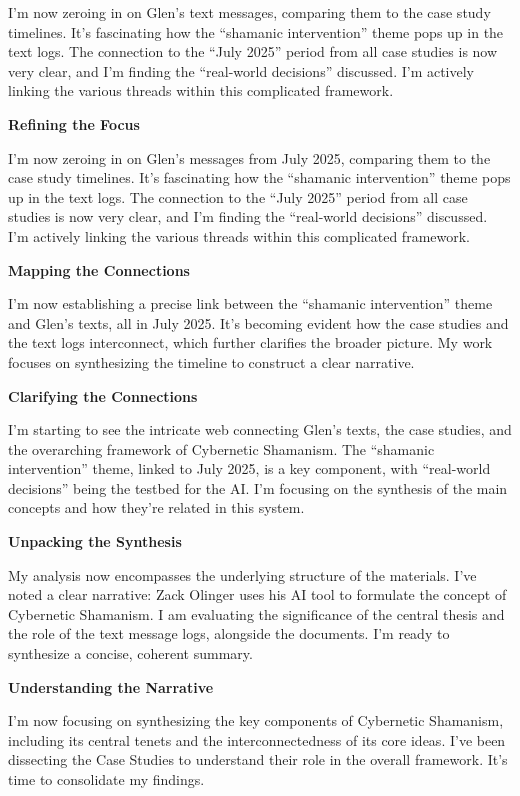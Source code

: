 \documentclass{article}
\begin{document}
I'm now zeroing in on Glen's text messages, comparing them to the case
study timelines. It's fascinating how the ``shamanic intervention''
theme pops up in the text logs. The connection to the ``July 2025''
period from all case studies is now very clear, and I'm finding the
``real-world decisions'' discussed. I'm actively linking the various
threads within this complicated framework.

\textbf{Refining the Focus}

I'm now zeroing in on Glen's messages from July 2025, comparing them to
the case study timelines. It's fascinating how the ``shamanic
intervention'' theme pops up in the text logs. The connection to the
``July 2025'' period from all case studies is now very clear, and I'm
finding the ``real-world decisions'' discussed. I'm actively linking the
various threads within this complicated framework.

\textbf{Mapping the Connections}

I'm now establishing a precise link between the ``shamanic
intervention'' theme and Glen's texts, all in July 2025. It's becoming
evident how the case studies and the text logs interconnect, which
further clarifies the broader picture. My work focuses on synthesizing
the timeline to construct a clear narrative.

\textbf{Clarifying the Connections}

I'm starting to see the intricate web connecting Glen's texts, the case
studies, and the overarching framework of Cybernetic Shamanism. The
``shamanic intervention'' theme, linked to July 2025, is a key
component, with ``real-world decisions'' being the testbed for the AI.
I'm focusing on the synthesis of the main concepts and how they're
related in this system.

\textbf{Unpacking the Synthesis}

My analysis now encompasses the underlying structure of the materials.
I've noted a clear narrative: Zack Olinger uses his AI tool to formulate
the concept of Cybernetic Shamanism. I am evaluating the significance of
the central thesis and the role of the text message logs, alongside the
documents. I'm ready to synthesize a concise, coherent summary.

\textbf{Understanding the Narrative}

I'm now focusing on synthesizing the key components of Cybernetic
Shamanism, including its central tenets and the interconnectedness of
its core ideas. I've been dissecting the Case Studies to understand
their role in the overall framework. It's time to consolidate my
findings.
\end{document}
